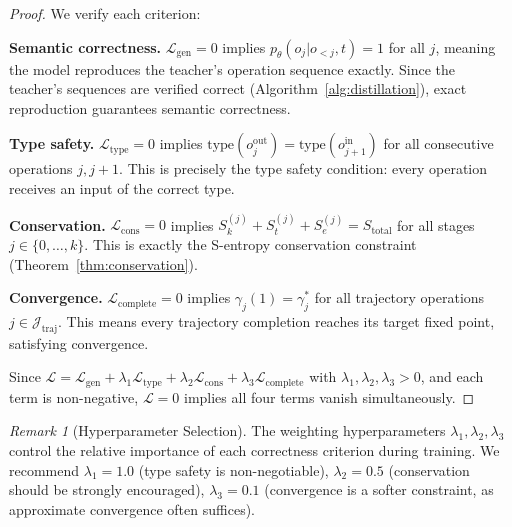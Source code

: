\documentclass[11pt,twocolumn,a4paper]{article}
\theoremstyle{definition}
\theoremstyle{remark}
\newtheorem{remark}[theorem]{Remark}
\newcommand{\Sk}{S_k}
\newcommand{\St}{S_t}
\newcommand{\Se}{S_e}
\newcommand{\loss}{\mathcal{L}}
\newcommand{\params}{\theta}
\begin{document}
\begin{proof}
We verify each criterion:

\textbf{Semantic correctness.} $\loss_{\mathrm{gen}} = 0$ implies $p_\params(o_j | o_{<j}, t) = 1$ for all $j$, meaning the model reproduces the teacher's operation sequence exactly. Since the teacher's sequences are verified correct (Algorithm~\ref{alg:distillation}), exact reproduction guarantees semantic correctness.

\textbf{Type safety.} $\loss_{\mathrm{type}} = 0$ implies $\text{type}(o_j^{\text{out}}) = \text{type}(o_{j+1}^{\text{in}})$ for all consecutive operations $j, j+1$. This is precisely the type safety condition: every operation receives an input of the correct type.

\textbf{Conservation.} $\loss_{\mathrm{cons}} = 0$ implies $\Sk^{(j)} + \St^{(j)} + \Se^{(j)} = S_{\mathrm{total}}$ for all stages $j \in \{0, \ldots, k\}$. This is exactly the S-entropy conservation constraint (Theorem~\ref{thm:conservation}).

\textbf{Convergence.} $\loss_{\mathrm{complete}} = 0$ implies $\gamma_j(1) = \gamma_j^*$ for all trajectory operations $j \in \mathcal{J}_{\text{traj}}$. This means every trajectory completion reaches its target fixed point, satisfying convergence.

Since $\loss = \loss_{\mathrm{gen}} + \lambda_1 \loss_{\mathrm{type}} + \lambda_2 \loss_{\mathrm{cons}} + \lambda_3 \loss_{\mathrm{complete}}$ with $\lambda_1, \lambda_2, \lambda_3 > 0$, and each term is non-negative, $\loss = 0$ implies all four terms vanish simultaneously.
\end{proof}

\begin{remark}[Hyperparameter Selection]
The weighting hyperparameters $\lambda_1, \lambda_2, \lambda_3$ control the relative importance of each correctness criterion during training. We recommend $\lambda_1 = 1.0$ (type safety is non-negotiable), $\lambda_2 = 0.5$ (conservation should be strongly encouraged), $\lambda_3 = 0.1$ (convergence is a softer constraint, as approximate convergence often suffices).
\end{remark}
\end{document}
